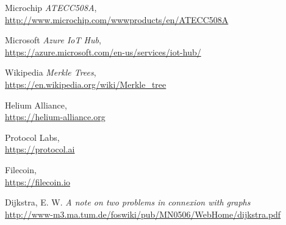 \documentclass[letterpaper,11pt]{article}
\begin{document}
\begin{thebibliography}{9}
    Microchip
        \emph{ATECC508A}, \\
        \url{http://www.microchip.com/wwwproducts/en/ATECC508A}

    Microsoft
        \emph{Azure IoT Hub}, \\
        \url{https://azure.microsoft.com/en-us/services/iot-hub/}

    Wikipedia
        \emph{Merkle Trees}, \\
        \url{https://en.wikipedia.org/wiki/Merkle_tree}

    Helium Alliance, \\
        \url{https://helium-alliance.org}

    Protocol Labs, \\
        \url{https://protocol.ai}

    Filecoin, \\
        \url{https://filecoin.io}

    Dijkstra, E. W.
    \emph{A note on two problems in connexion with graphs} \\
    \url{http://www-m3.ma.tum.de/foswiki/pub/MN0506/WebHome/dijkstra.pdf}

\end{thebibliography}
\end{document}
